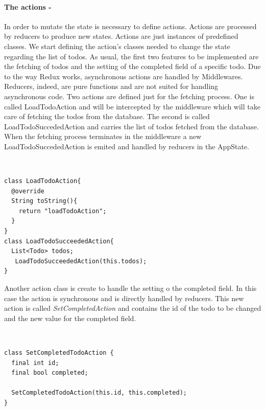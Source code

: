 \paragraph{The actions - }
\label{subpar:todo_app_bloc_core_state}In order to mutate the state is necessary to define actions. Actions are processed by reducers to produce new states. Actions are just instances of predefined classes. We start defining the action's classes needed to change the state regarding the list of todos. As usual, the first two features to be implemented are the fetching of todos and the setting of the completed field of a specific todo. Due to the way Redux works, asynchronous actions are handled by Middlewares. Reducers, indeed, are pure functions and are not suited for handling asynchronous code. Two actions are defined just for the fetching process. One is called LoadTodoAction and will be intercepted by the middleware which will take care of fetching the todos from the database. The second is called LoadTodoSuccededAction and carries the list of todos fetched from the database. When the fetching process terminates in the middleware a new LoadTodoSuccededAction is emited and handled by reducers in the AppState.
\begin{code}
\mbox{}\\
 \mbox{}
		\label{code:2.14}
\begin{verbatim}
class LoadTodoAction{
  @override
  String toString(){
    return "loadTodoAction";
  }
}
class LoadTodoSucceededAction{
  List<Todo> todos;
   LoadTodoSucceededAction(this.todos);
}
\end{verbatim}
\mbox{}
\end{code}

Another action class is create to handle the setting o the completed field. In this case the action is synchronous and is directly handled by reducers. This new action is called \textit{SetCompletedAction} and contains the id of the todo to be changed and the new value for the completed field.
\begin{code}
\mbox{}\\
 \mbox{}
		\label{code:2.14}
\begin{verbatim}
class SetCompletedTodoAction {
  final int id;
  final bool completed;

  SetCompletedTodoAction(this.id, this.completed);
}
\end{verbatim}
\mbox{}
\end{code}

